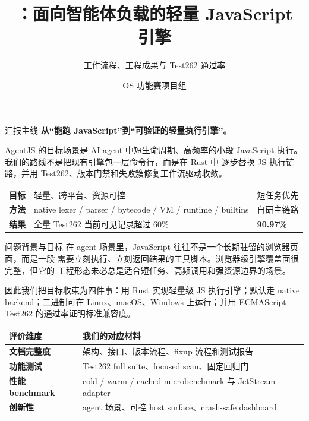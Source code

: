 \documentclass[aspectratio=169,UTF8,fontset=windows]{ctexbeamer}
\title[\ProjectName{} 工作流与成果]{\ProjectName{}：面向智能体负载的轻量 JavaScript 引擎}
\subtitle{工作流程、工程成果与 Test262 通过率}
\author{OS 功能赛项目组}
\institute{Rust native backend}
\date{\ReportDate}
\newcommand{\ProjectName}{AgentJS}
\newcommand{\FullPassRate}{90.97\%}
\newcommand{\leadtext}[1]{%
  {\large\bfseries #1}\par\vspace{0.35em}
}
\begin{document}
\begin{frame}
  \titlepage
\end{frame}

\begin{frame}{汇报主线}
  \leadtext{从“能跑 JavaScript”到“可验证的轻量执行引擎”。}

  \ProjectName{} 的目标场景是 AI agent 中短生命周期、高频率的小段
  JavaScript 执行。我们的路线不是把现有引擎包一层命令行，而是在 Rust 中
  逐步替换 JS 执行链路，并用 Test262、版本门禁和失败簇修复工作流驱动收敛。

  \vspace{0.8em}
  \begin{tabularx}{\textwidth}{>{\bfseries}p{} X >{\raggedleft\arraybackslash}p{}}
    \toprule
    目标 & 轻量、跨平台、资源可控 & 短任务优先 \\
    方法 & native lexer / parser / bytecode / VM / runtime / builtins & 自研主链路 \\
    结果 & 全量 Test262 当前可见记录超过 60\% & {\Large\bfseries \FullPassRate} \\
    \bottomrule
  \end{tabularx}
\end{frame}

\begin{frame}{问题背景与目标}
  在 agent 场景里，JavaScript 往往不是一个长期驻留的浏览器页面，而是一段
  需要立刻执行、立刻返回结果的工具脚本。浏览器级引擎覆盖面很完整，但它的
  工程形态未必总是适合短任务、高频调用和强资源边界的场景。

  \vspace{0.6em}
  因此我们把目标收束为四件事：用 Rust 实现轻量级 JS 执行引擎；默认走
  native backend；二进制可在 Linux、macOS、Windows 上运行；并用
  ECMAScript Test262 的通过率证明标准兼容度。

  \vspace{0.8em}
  \begin{tabularx}{\textwidth}{>{\bfseries}p{} X}
    \toprule
    评价维度 & 我们的对应材料 \\
    \midrule
    文档完整度 & 架构、接口、版本流程、fixup 流程和测试报告 \\
    功能测试 & Test262 full suite、focused scan、固定回归门 \\
    性能 benchmark & cold / warm / cached microbenchmark 与 JetStream adapter \\
    创新性 & agent 场景、可控 host surface、crash-safe dashboard \\
    \bottomrule
  \end{tabularx}
\end{frame}
\end{document}
